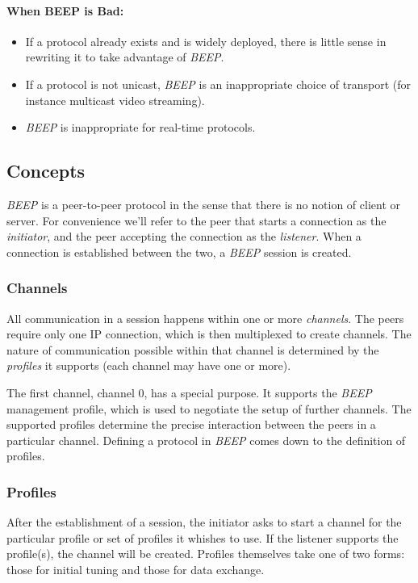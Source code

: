 \paragraph{When BEEP is Bad:} 
\begin{itemize}
 \item If a protocol already exists and is widely deployed, there is little sense in rewriting it to take advantage of \emph{BEEP}.
 \item If a protocol is not unicast, \emph{BEEP} is an inappropriate choice of transport (for instance multicast video streaming).
 \item \emph{BEEP} is inappropriate for real-time protocols.
\end{itemize}



\subsection{Concepts}
\emph{BEEP} is a peer-to-peer protocol in the sense that there is no notion of client or server. For convenience we'll refer to the peer that starts a connection as the \emph{initiator}, and the peer accepting the connection as the \emph{listener}. When a connection is established between the two, a \emph{BEEP} session is created.

\subsubsection{Channels}
All communication in a session happens within one or more \emph{channels}. The peers require only one IP connection, which is then multiplexed to create channels. The nature of communication possible within that channel is determined by the \emph{profiles} it supports (each channel may have one or more).

The first channel, channel 0, has a special purpose. It supports the \emph{BEEP} management profile, which is used to negotiate the setup of further channels. The supported profiles determine the precise interaction between the peers in a particular channel. Defining a protocol in \emph{BEEP} comes down to the definition of profiles.

\subsubsection{Profiles}
After the establishment of a session, the initiator asks to start a channel for the particular profile or set of profiles it whishes to use. If the listener supports the profile(s), the channel will be created. Profiles themselves take one of two forms: those for initial tuning and those for data exchange.

